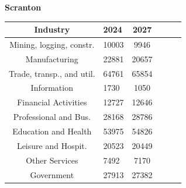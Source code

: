 \documentclass{article}
\begin{document}
\newpage
\begin{table}[h]
\centering
\textbf{Scranton} \\
\begin{tabularx}{210pt}{|c|X|c|X|c|X|}
    \hline
    \textbf{Industry} & \textbf{2024} & \textbf{2027} \\
    \hline
    Mining, logging, constr. & 10003 & 9946 \\
    \hline
    Manufacturing & 22881 & 20657 \\
    \hline
    Trade, transp., and util. & 64761 & 65854 \\
    \hline
    Information & 1730 & 1050  \\
    \hline
    Financial Activities & 12727 & 12646 \\
    \hline
    Professional and Bus. & 28168 & 28786 \\
    \hline
    Education and Health & 53975 & 54826 \\
    \hline
    Leisure and Hospit. & 20523 & 20449 \\
    \hline
    Other Services & 7492 & 7170 \\
    \hline
    Government & 27913 & 27382 \\
    \hline
\end{tabularx}
\end{table}
\end{document}
